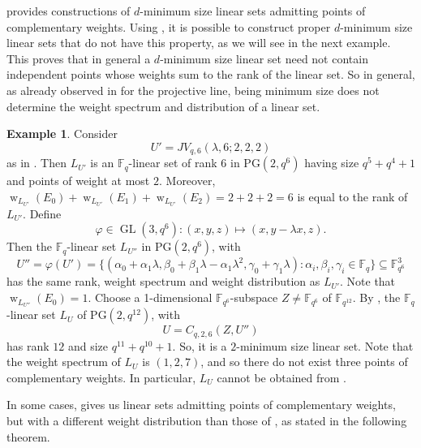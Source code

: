 \documentclass[11pt]{article}
\theoremstyle{definition}
\newtheorem{example}[theorem]{Example}
\newcommand{\F}{{\mathbb F}}
\newcommand{\PG}{\mathrm{PG}}
\DeclareMathOperator{\ww}{w}
\DeclareMathOperator{\GL}{GL}
\begin{document}
 provides constructions of $d$-minimum size linear sets admitting points of complementary weights. Using , it is possible to construct proper $d$-minimum size linear sets that do not have this property, as we will see in the next example.
This proves that in general a $d$-minimum size linear set need not contain independent points whose weights sum to the rank of the linear set.
So in general, as already observed in \cite{napolitano2022classification} for the projective line, being minimum size does not determine the weight spectrum and distribution of a linear set.

\begin{example}
Consider 
\[
 U'=JV_{q,6}(\lambda,6;2,2,2)
\]
as in .
Then $L_{U'}$ is an $\F_q$-linear set of rank $6$ in $\PG(2,q^6)$ having size $q^5+q^4+1$ and points of weight at most $2$. Moreover, $\ww_{L_{U'}}(E_0)+\ww_{L_{U'}}(E_1)+\ww_{L_{U'}}(E_2)=2+2+2=6$ is equal to the rank of $L_{U'}$. 
Define
\[
 \varphi \in \GL(3,q^6): (x,y,z) \mapsto (x,y-\lambda x,z).
\]
Then the $\F_q$-linear set $L_{U''}$ in $\PG(2,q^6)$, with
\[
 U''=\varphi(U') 
 = \{ (\alpha_0+\alpha_1 \lambda, \beta_0+\beta_1 \lambda-\alpha_1 \lambda^2, \gamma_0+\gamma_1 \lambda) \colon \alpha_i,\beta_i,\gamma_i \in \F_q \} \subseteq \F_{q^6}^3 
\]
has the same rank, weight spectrum and weight distribution as $L_{U'}$.
Note that $\ww_{L_{U''}}(E_0)=1$.
Choose a 1-dimensional $\F_{q^6}$-subspace $Z \neq \F_{q^6}$ of $\F_{q^{12}}$.
By , the $\F_q$-linear set $L_U$ of $\PG(2,q^{12})$, with 
\[
U= C_{q,2,6}(Z,U'')
\]
has rank $12$ and size $q^{11}+q^{10}+1$. So, it is a $2$-minimum size linear set.
Note that the weight spectrum of $L_U$ is $(1,2,7)$, and so there do not exist three points of complementary weights.
In particular, $L_U$ cannot be obtained from .
\end{example}

In some cases,  gives us linear sets admitting points of complementary weights, but with a different weight distribution than those of , as stated in the following theorem.
\end{document}
